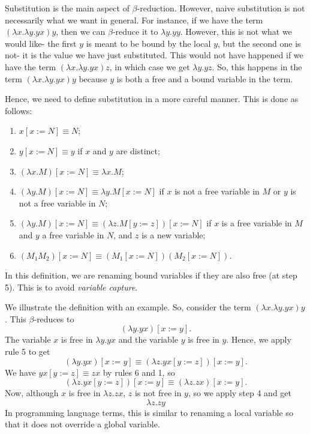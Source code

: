\documentclass[a4paper, openany]{memoir}
\theoremstyle{definition}
\begin{document}
    Substitution is the main aspect of $\beta$-reduction. However, naive substitution is not necessarily what we want in general. For instance, if we have the term $(\lambda x.\lambda y.yx) y$, then we can $\beta$-reduce it to $\lambda y. yy$. However, this is not what we would like- the first $y$ is meant to be bound by the local $y$, but the second one is not- it is the value we have just substituted. This would not have happened if we have the term $(\lambda x. \lambda y. yx)z$, in which case we get $\lambda y.yz$. So, this happens in the term $(\lambda x. \lambda y. yx)y$ because $y$ is both a free and a bound variable in the term.

    Hence, we need to define substitution in a more careful manner. This is done as follows:
    \begin{enumerate}
        \item $x[x := N] \equiv N$;
        \item $y[x := N] \equiv y$ if $x$ and $y$ are distinct;
        \item $(\lambda x.M)[x := N] \equiv \lambda x.M$;
        \item $(\lambda y.M)[x := N] \equiv \lambda y. M[x := N]$ if $x$ is not a free variable in $M$ or $y$ is not a free variable in $N$;
        \item $(\lambda y.M)[x := N] \equiv (\lambda z.M[y:=z])[x := N]$ if $x$ is a free variable in $M$ and $y$ a free variable in $N$, and $z$ is a new variable;
        \item $(M_1 M_2)[x := N] \equiv (M_1[x := N])(M_2[x := N])$.
    \end{enumerate}
    In this definition, we are renaming bound variables if they are also free (at step 5). This is to avoid \emph{variable capture}.
    
    We illustrate the definition with an example. So, consider the term $(\lambda x.\lambda y.yx)y$. This $\beta$-reduces to
    \[(\lambda y.yx)[x := y].\]
    The variable $x$ is free in $\lambda y.yx$ and the variable $y$ is free in $y$. Hence, we apply rule 5 to get
    \[(\lambda y.yx)[x := y] \equiv (\lambda z.yx[y := z])[x := y].\]
    We have $yx[y := z] \equiv zx$ by rules 6 and 1, so
    \[(\lambda z.yx[y := z])[x := y] \equiv (\lambda z.zx)[x := y].\]
    Now, although $x$ is free in $\lambda z.zx$, $z$ is not free in $y$, so we apply step 4 and get
    \[\lambda z.zy\]
    In programming language terms, this is similar to renaming a local variable so that it does not override a global variable.
    
\end{document}
